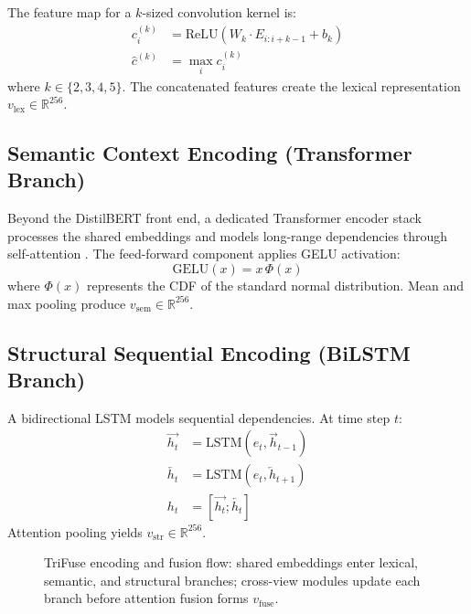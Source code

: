 The feature map for a $k$-sized convolution kernel is:
\begin{equation}
\begin{aligned}
c_i^{(k)} &= \mathrm{ReLU}(W_k \cdot E_{i:i+k-1} + b_k) \\
\hat{c}^{(k)} &= \max_i c_i^{(k)}
\end{aligned}
\end{equation}
where $k \in \{2,3,4,5\}$. The concatenated features create the lexical representation $v_{\mathrm{lex}} \in \mathbb{R}^{256}$.

\subsection{Semantic Context Encoding (Transformer Branch)}

Beyond the DistilBERT front end, a dedicated Transformer encoder stack processes the shared embeddings and models long-range dependencies through self-attention \cite{ref9}. The feed-forward component applies GELU activation:
\begin{equation}
\mathrm{GELU}(x) = x \, \Phi(x)
\end{equation}
where $\Phi(x)$ represents the CDF of the standard normal distribution. Mean and max pooling produce $v_{\mathrm{sem}} \in \mathbb{R}^{256}$.

\subsection{Structural Sequential Encoding (BiLSTM Branch)}

A bidirectional LSTM \cite{ref8} models sequential dependencies. At time step $t$:
\begin{equation}
\begin{aligned}
\overrightarrow{h_t} &= \mathrm{LSTM}(e_t, \overrightarrow{h}_{t-1}) \\
\overleftarrow{h_t} &= \mathrm{LSTM}(e_t, \overleftarrow{h}_{t+1}) \\
h_t &= [\overrightarrow{h_t}; \overleftarrow{h_t}]
\end{aligned}
\end{equation}
Attention pooling yields $v_{\mathrm{str}} \in \mathbb{R}^{256}$.

\begin{figure}[!t]
\centering

\caption{TriFuse encoding and fusion flow: shared embeddings enter lexical, semantic, and structural branches; cross-view modules update each branch before attention fusion forms $v_{\mathrm{fuse}}$.}
\label{fig:branches_fusion}
\end{figure}

